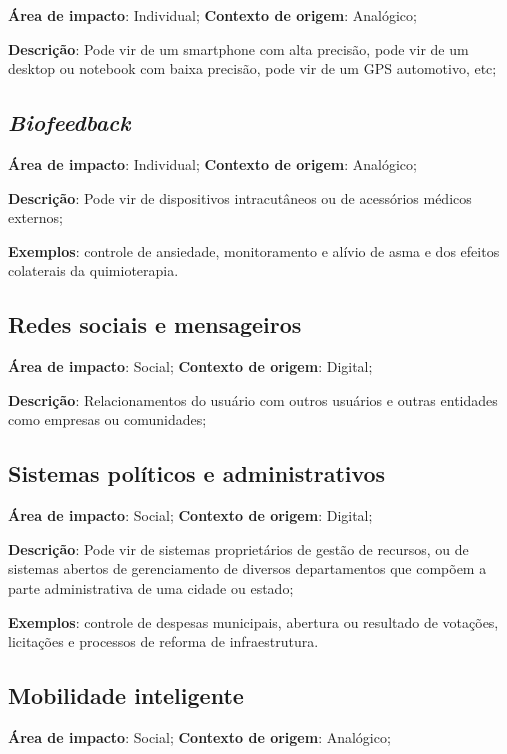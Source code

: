 \textbf{Área de impacto}: Individual; \textbf{Contexto de origem}: Analógico;

\textbf{Descrição}: Pode vir de um smartphone com alta precisão, pode vir de um desktop ou notebook com baixa precisão, pode vir de um GPS automotivo, etc;

\subsection{\textit{Biofeedback}}

\textbf{Área de impacto}: Individual; \textbf{Contexto de origem}: Analógico;

\textbf{Descrição}: Pode vir de dispositivos intracutâneos ou de acessórios médicos externos;

\textbf{Exemplos}: controle de ansiedade, monitoramento e alívio de asma e dos efeitos colaterais da quimioterapia.

\subsection{Redes sociais e mensageiros}

\textbf{Área de impacto}: Social; \textbf{Contexto de origem}: Digital;

\textbf{Descrição}: Relacionamentos do usuário com outros usuários e outras entidades como empresas ou comunidades;

\subsection{Sistemas políticos e administrativos}

\textbf{Área de impacto}: Social; \textbf{Contexto de origem}: Digital;

\textbf{Descrição}: Pode vir de sistemas proprietários de gestão de recursos, ou de sistemas abertos de gerenciamento de diversos departamentos que compõem a parte administrativa de uma cidade ou estado;

\textbf{Exemplos}: controle de despesas municipais, abertura ou resultado de votações, licitações e processos de reforma de infraestrutura.

\subsection{Mobilidade inteligente}

\textbf{Área de impacto}: Social; \textbf{Contexto de origem}: Analógico;

